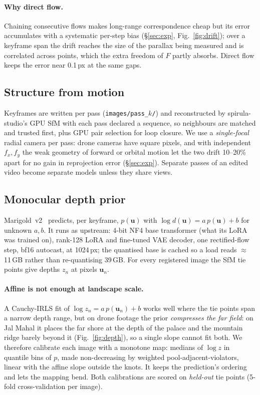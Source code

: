 \documentclass[10pt,a4paper,twocolumn]{article}
\begin{document}
\paragraph{Why direct flow.} Chaining consecutive flows makes long-range correspondence cheap but its error accumulates with a systematic per-step bias (\S\ref{sec:exp}, Fig.~\ref{fig:drift}); over a keyframe span the drift reaches the size of the parallax being measured and is correlated across points, which the extra freedom of $F$ partly absorbs. Direct flow keeps the error near 0.1\,px at the same gaps.

\subsection{Structure from motion}
Keyframes are written per pass (\texttt{images/pass\_$k$/}) and reconstructed by spirula-studio's GPU SfM with each pass declared a sequence, so neighbours are matched and trusted first, plus GPU pair selection for loop closure. We use a \emph{single-focal} radial camera per pass: drone cameras have square pixels, and with independent $f_x,f_y$ the weak geometry of forward or orbital motion let the two drift 10--20\% apart for no gain in reprojection error (\S\ref{sec:exp}). Separate passes of an edited video become separate models unless they share views.

\subsection{Monocular depth prior}
Marigold~v2~\cite{pavlovic2026marigoldv2} predicts, per keyframe, $p(\mathbf{u})$ with $\log d(\mathbf{u}) = a\,p(\mathbf{u})+b$ for unknown $a,b$. It runs as upstream: 4-bit NF4 base transformer (what its LoRA was trained on), rank-128 LoRA and fine-tuned VAE decoder, one rectified-flow step, bf16 autocast, at 1024\,px; the quantised base is cached so a load reads $\approx$11\,GB rather than re-quantising 39\,GB. For every registered image the SfM tie points give depths $z_n$ at pixels $\mathbf{u}_n$.

\paragraph{Affine is not enough at landscape scale.} A Cauchy-IRLS fit of $\log z_n = a\,p(\mathbf{u}_n)+b$ works well where the tie points span a narrow depth range, but on drone footage the prior \emph{compresses the far field}: on Jal Mahal it places the far shore at the depth of the palace and the mountain ridge barely beyond it (Fig.~\ref{fig:depth}), so a single slope cannot fit both. We therefore calibrate each image with a monotone map: medians of $\log z$ in quantile bins of $p$, made non-decreasing by weighted pool-adjacent-violators, linear with the affine slope outside the knots. It keeps the prediction's ordering and lets the mapping bend. Both calibrations are scored on \emph{held-out} tie points (5-fold cross-validation per image).
\end{document}
